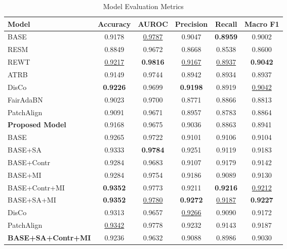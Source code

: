 \begin{table}[h]
\centering
\caption{Model Evaluation Metrics}
\label{tab:model_metrics}
\begin{tabular}{|l|c|c|c|c|c|}
\hline
Model & Accuracy & AUROC & Precision & Recall & Macro F1 \\
\hline
BASE & 0.9178 & \underline{0.9787} & 0.9047 & \textbf{0.8959} & 0.9002 \\
RESM & 0.8849 & 0.9672 & 0.8668 & 0.8538 & 0.8600 \\
REWT & \underline{0.9217} & \textbf{0.9816} & \underline{0.9167} & \underline{0.8937} & \textbf{0.9042} \\
ATRB & 0.9149 & 0.9744 & 0.8942 & 0.8934 & 0.8937 \\
DisCo & \textbf{0.9226} & 0.9699 & \textbf{0.9198} & 0.8919 & \underline{0.9042} \\
FairAdaBN & 0.9023 & 0.9700 & 0.8771 & 0.8866 & 0.8813 \\
PatchAlign & 0.9091 & 0.9671 & 0.8957 & 0.8783 & 0.8864 \\
\textbf{Proposed Model} & 0.9168 & 0.9675 & 0.9036 & 0.8863 & 0.8941 \\
\hline
BASE & 0.9265 & 0.9722 & 0.9101 & 0.9106 & 0.9104 \\
BASE+SA & 0.9333 & \textbf{0.9784} & 0.9251 & 0.9119 & 0.9183 \\
BASE+Contr & 0.9284 & 0.9683 & 0.9107 & 0.9179 & 0.9142 \\
BASE+MI & 0.9284 & 0.9754 & 0.9186 & 0.9089 & 0.9130 \\
BASE+Contr+MI & \textbf{0.9352} & 0.9773 & 0.9211 & \textbf{0.9216} & \underline{0.9212} \\
BASE+SA+MI & \textbf{0.9352} & \underline{0.9780} & \textbf{0.9272} & \underline{0.9187} & \textbf{0.9227} \\
DisCo & 0.9313 & 0.9657 & \underline{0.9266} & 0.9090 & 0.9172 \\
PatchAlign & \underline{0.9342} & 0.9778 & 0.9232 & 0.9143 & 0.9187 \\
\textbf{BASE+SA+Contr+MI} & 0.9236 & 0.9632 & 0.9088 & 0.8986 & 0.9030 \\
\hline
\end{tabular}
\end{table}





